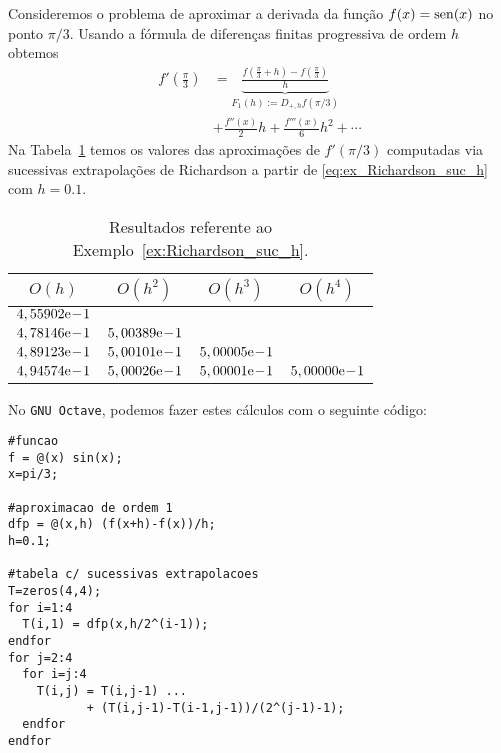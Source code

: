 \begin{ex}\label{ex:Richardson_suc_h}
  Consideremos o problema de aproximar a derivada da função $f(x) = \operatorname{sen}(x)$ no ponto $\pi/3$. Usando a fórmula de diferenças finitas progressiva de ordem $h$ obtemos
  \begin{align}
    f'\left(\frac{\pi}{3}\right) &= \underbrace{\frac{f\left(\frac{\pi}{3}+h\right)-f\left(\frac{\pi}{3}\right)}{h}}_{F_1(h) := D_{+,h}f(\pi/3)} \nonumber\\
          &+ \frac{f''(x)}{2}h + \frac{f'''(x)}{6}h^2 + \cdots \label{eq:ex_Richardson_suc_h}
  \end{align}
Na Tabela~\ref{tab:ex_Richardson_suc_h} temos os valores das aproximações de $f'(\pi/3)$ computadas via sucessivas extrapolações de Richardson a partir de \eqref{eq:ex_Richardson_suc_h} com $h=0.1$.

\begin{table}[h!]
  \centering
  \caption{Resultados referente ao Exemplo~\ref{ex:Richardson_suc_h}.}
  \begin{tabular}{cccc}\hline
    $O(h)$ & $O(h^2)$ & $O(h^3)$ & $O(h^4)$\\ \hline
    $4,55902\mathrm{e}\!-\!1$ \\
    $4,78146\mathrm{e}\!-\!1$ & $5,00389\mathrm{e}\!-\!1$ \\
    $4,89123\mathrm{e}\!-\!1$ & $5,00101\mathrm{e}\!-\!1$ & $5,00005\mathrm{e}\!-\!1$ \\
    $4,94574\mathrm{e}\!-\!1$ & $5,00026\mathrm{e}\!-\!1$ & $5,00001\mathrm{e}\!-\!1$ & $5,00000\mathrm{e}\!-\!1$ \\\hline
  \end{tabular}
  \label{tab:ex_Richardson_suc_h}
\end{table}

\ifisoctave
No \verb+GNU Octave+, podemos fazer estes cálculos com o seguinte código:
\begin{verbatim}
#funcao
f = @(x) sin(x);
x=pi/3;

#aproximacao de ordem 1
dfp = @(x,h) (f(x+h)-f(x))/h;
h=0.1;

#tabela c/ sucessivas extrapolacoes
T=zeros(4,4);
for i=1:4
  T(i,1) = dfp(x,h/2^(i-1));
endfor
for j=2:4
  for i=j:4
    T(i,j) = T(i,j-1) ... 
           + (T(i,j-1)-T(i-1,j-1))/(2^(j-1)-1);
  endfor
endfor
\end{verbatim}
\fi
\end{ex}

